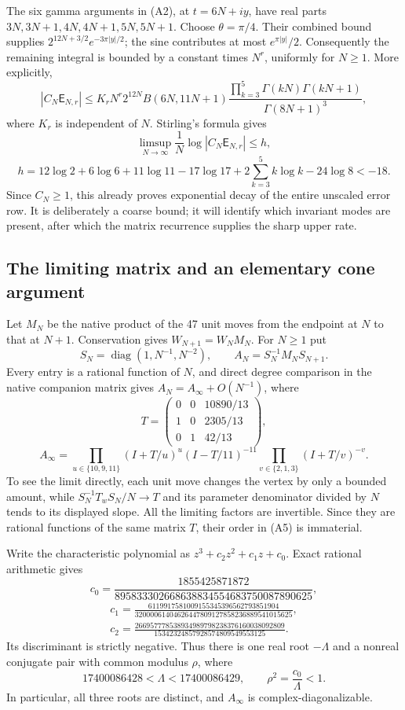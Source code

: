 \documentclass[11pt]{article}
\begin{document}
The six gamma arguments in (A2), at $t=6N+iy$, have real parts
$3N,3N+1,4N,4N+1,5N,5N+1$.  Choose $\theta=\pi/4$.
Their combined bound supplies
$2^{12N+3/2}e^{-3\pi|y|/2}$; the sine contributes at most
$e^{\pi|y|}/2$.  Consequently the remaining integral is bounded by
a constant times $N^r$, uniformly for $N\ge1$.  More explicitly,
\[
 |C_N\mathsf E_{N,r}|
 \le K_r N^r 2^{12N}
 B(6N,11N+1)
 \frac{\prod_{k=3}^5\Gamma(kN)\Gamma(kN+1)}
      {\Gamma(8N+1)^3},                                  \tag{A3}
\]
where $K_r$ is independent of $N$.  Stirling's formula gives
\[
 \limsup_{N\to\infty}\frac1N\log|C_N\mathsf E_{N,r}|
 \le h,
\]
\[
 h=12\log2+6\log6+11\log11-17\log17
       +2\sum_{k=3}^5 k\log k-24\log8
   <-18.                                                 \tag{A4}
\]
Since $C_N\ge1$, this already proves exponential decay of the entire
unscaled error row.  It is deliberately a coarse bound; it will identify
which invariant modes are present, after which the matrix recurrence
supplies the sharp upper rate.

\subsection{The limiting matrix and an elementary cone argument}
Let $M_N$ be the native product of the 47 unit moves from the endpoint
at $N$ to that at $N+1$.  Conservation gives $W_{N+1}=W_NM_N$.
For $N\ge1$ put
\[
 S_N=\operatorname{diag}(1,N^{-1},N^{-2}),\qquad
 A_N=S_N^{-1}M_NS_{N+1}.
\]
Every entry is a rational function of $N$, and direct degree comparison
in the native companion matrix gives $A_N=A_\infty+O(N^{-1})$, where
\[
 T=\begin{pmatrix}0&0&10890/13\\1&0&2305/13\\0&1&42/13\end{pmatrix},
\]
\[
 A_\infty=
 \prod_{u\in\{10,9,11\}}(I+T/u)^u
 (I-T/11)^{-11}
 \prod_{v\in\{2,1,3\}}(I+T/v)^{-v}.                       \tag{A5}
\]
To see the limit directly, each unit move changes the vertex by only a
bounded amount, while $S_N^{-1}T_wS_N/N\to T$ and its parameter
denominator divided by $N$ tends to its displayed slope.  All the
limiting factors are invertible.  Since they are rational functions
of the same matrix $T$, their order in (A5) is immaterial.

Write the characteristic polynomial as
$z^3+c_2z^2+c_1z+c_0$.  Exact rational arithmetic gives
\[
 c_0=\frac{1855425871872}{895833302668638834554683750087890625},
\]
\[
\begin{gathered}
 c_1=\frac{6119917581009155345396562793851904}
 {32000061404626447809127858236889541015625},\\
 c_2=\frac{266957778538934989798238376160038092809}
 {15342324857928574809549553125}.
\end{gathered}
\]
Its discriminant is strictly negative.  Thus there is one real
root $-\Lambda$ and a nonreal conjugate pair with common modulus
$\rho$, where
\[
 17400086428<\Lambda<17400086429,\qquad
 \rho^2=\frac{c_0}{\Lambda}<1.                             \tag{A6}
\]
In particular, all three roots are distinct, and $A_\infty$ is
complex-diagonalizable.
\end{document}
